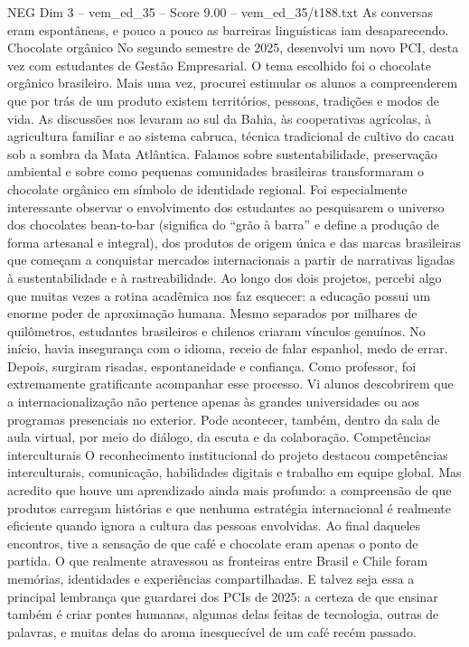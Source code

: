 \begin{textsample}{NEG Dim 3 – vem\_ed\_35 – Score 9.00 – vem\_ed\_35/t188.txt}
As conversas eram espontâneas, e pouco a pouco as barreiras linguísticas iam desaparecendo.
Chocolate orgânico No segundo semestre de 2025, desenvolvi um novo PCI, desta vez com estudantes de Gestão Empresarial.
O tema escolhido foi o chocolate orgânico brasileiro.
Mais uma vez, procurei estimular os alunos a compreenderem que por trás de um produto existem territórios, pessoas, tradições e modos de vida.
As discussões nos levaram ao sul da Bahia, às cooperativas agrícolas, à agricultura familiar e ao sistema cabruca, técnica tradicional de cultivo do cacau sob a sombra da Mata Atlântica.
Falamos sobre sustentabilidade, preservação ambiental e sobre como pequenas comunidades brasileiras transformaram o chocolate orgânico em símbolo de identidade regional.
Foi especialmente interessante observar o envolvimento dos estudantes ao pesquisarem o universo dos chocolates bean-to-bar (significa do “grão à barra” e define a produção de forma artesanal e integral), dos produtos de origem única e das marcas brasileiras que começam a conquistar mercados internacionais a partir de narrativas ligadas à sustentabilidade e à rastreabilidade.
Ao longo dos dois projetos, percebi algo que muitas vezes a rotina acadêmica nos faz esquecer: a educação possui um enorme poder de aproximação humana.
Mesmo separados por milhares de quilômetros, estudantes brasileiros e chilenos criaram vínculos genuínos.
No início, havia insegurança com o idioma, receio de falar espanhol, medo de errar.
Depois, surgiram risadas, espontaneidade e confiança.
Como professor, foi extremamente gratificante acompanhar esse processo.
Vi alunos descobrirem que a internacionalização não pertence apenas às grandes universidades ou aos programas presenciais no exterior.
Pode acontecer, também, dentro da sala de aula virtual, por meio do diálogo, da escuta e da colaboração.
Competências interculturais O reconhecimento institucional do projeto destacou competências interculturais, comunicação, habilidades digitais e trabalho em equipe global.
Mas acredito que houve um aprendizado ainda mais profundo: a compreensão de que produtos carregam histórias e que nenhuma estratégia internacional é realmente eficiente quando ignora a cultura das pessoas envolvidas.
Ao final daqueles encontros, tive a sensação de que café e chocolate eram apenas o ponto de partida.
O que realmente atravessou as fronteiras entre Brasil e Chile foram memórias, identidades e experiências compartilhadas.
E talvez seja essa a principal lembrança que guardarei dos PCIs de 2025: a certeza de que ensinar também é criar pontes humanas, algumas delas feitas de tecnologia, outras de palavras, e muitas delas do aroma inesquecível de um café recém passado.

\end{textsample}
